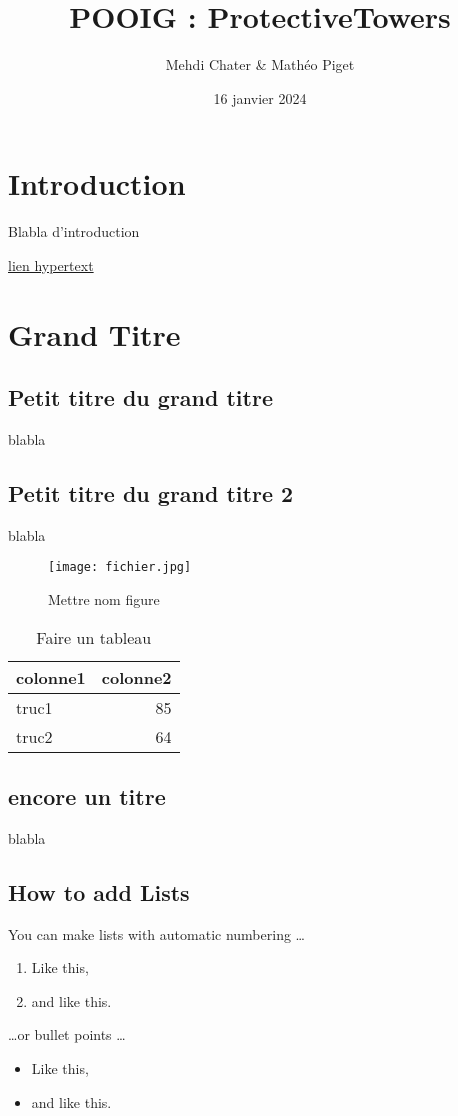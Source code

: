 \documentclass{article}
\title{POOIG : ProtectiveTowers}
\author{Mehdi Chater \& Mathéo Piget}
\date{16 janvier 2024}
\begin{document}
\maketitle


\section{Introduction}

Blabla d'introduction

\href{https://www.overleaf.com/learn}{lien hypertext}

\section{Grand Titre}

\subsection{Petit titre du grand titre}

blabla

\subsection{Petit titre du grand titre 2}

blabla

\begin{figure}
\centering
\texttt{[image: fichier.jpg]} %
\caption{\label{fig:frog}Mettre nom figure}
\end{figure}

\begin{table}
\centering
\begin{tabular}{l|r}
colonne1 & colonne2 \\\hline
truc1 & 85 \\
truc2 & 64
\end{tabular}
\caption{\label{tab:widgets}Faire un tableau}
\end{table}

\subsection{encore un titre}

blabla 

\subsection{How to add Lists}

You can make lists with automatic numbering \dots

\begin{enumerate}
\item Like this,
\item and like this.
\end{enumerate}
\dots or bullet points \dots
\begin{itemize}
\item Like this,
\item and like this.
\end{itemize}




\end{document}
